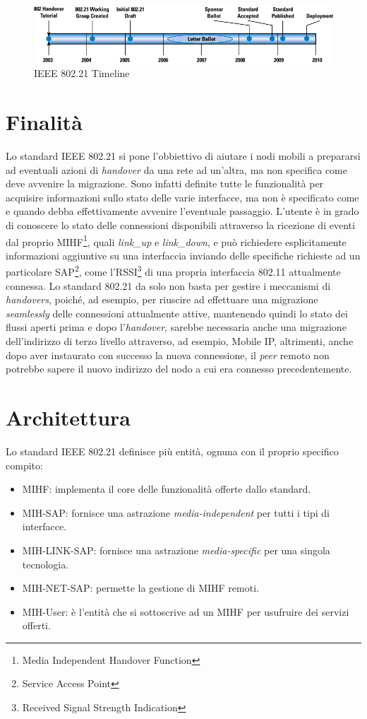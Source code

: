 \begin{figure}[h!]
\centering
\includegraphics[scale=0.48]{ieee_timeline.jpg}
\caption{IEEE 802.21 Timeline}
\end{figure}

\section{Finalità}
Lo standard IEEE 802.21 si pone l'obbiettivo di aiutare i nodi mobili a prepararsi ad eventuali azioni di {\em handover} da una rete ad un'altra, ma non specifica come deve avvenire la migrazione. Sono infatti definite tutte le funzionalità per acquisire informazioni sullo stato delle varie interfacce, ma non è specificato come e quando debba effettivamente avvenire l'eventuale passaggio. L'utente è in grado di conoscere lo stato delle connessioni disponibili attraverso la ricezione di eventi dal proprio MIHF\footnote{Media Independent Handover Function}, quali {\em link\_up} e {\em link\_down}, e può richiedere esplicitamente informazioni aggiuntive su una interfaccia inviando delle specifiche richieste ad un particolare SAP\footnote{Service Access Point}, come l'RSSI\footnote{Received Signal Strength Indication} di una propria interfaccia 802.11 attualmente connessa. Lo standard 802.21 da solo non basta per gestire i meccanismi di {\em handovers}, poiché, ad esempio, per riuscire ad effettuare una migrazione {\em seamlessly} delle connessioni attualmente attive, mantenendo quindi lo stato dei flussi aperti prima e dopo l'{\em handover}, sarebbe necessaria anche una migrazione dell'indirizzo di terzo livello attraverso, ad esempio, Mobile IP\cite{mobileip}, altrimenti, anche dopo aver instaurato con successo la nuova connessione, il {\em peer} remoto non potrebbe sapere il nuovo indirizzo del nodo a cui era connesso precedentemente.

\section{Architettura}
Lo standard IEEE 802.21 definisce più entità, ognuna con il proprio specifico compito:
\begin{itemize}
\item MIHF: implementa il core delle funzionalità offerte dallo standard.
\item MIH-SAP: fornisce una astrazione {\em media-independent} per tutti i tipi di interfacce.
\item MIH-LINK-SAP: fornisce una astrazione {\em media-specific} per una singola tecnologia.
\item MIH-NET-SAP: permette la gestione di MIHF remoti.
\item MIH-User: è l'entità che si sottoscrive ad un MIHF per usufruire dei servizi offerti.
\end{itemize}

